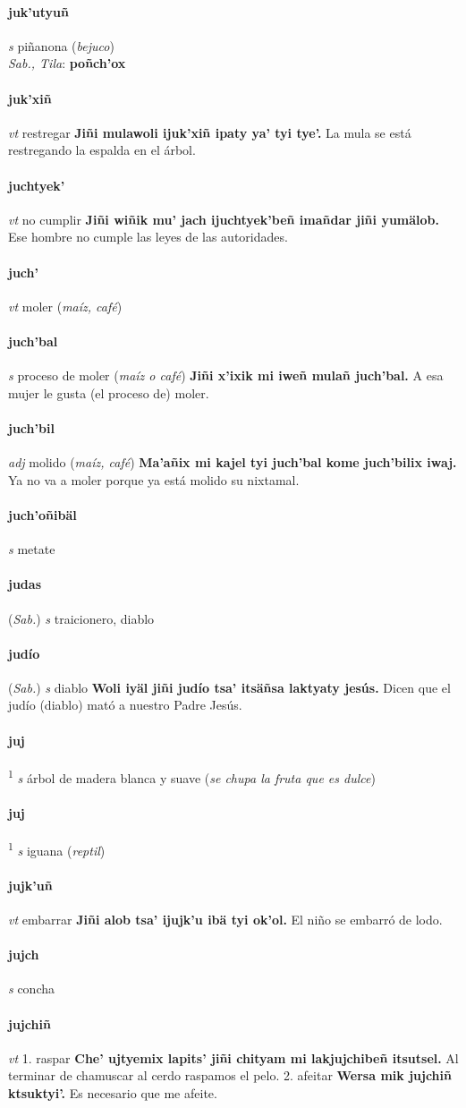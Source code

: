 \documentclass{scrbook}
\newcommand{\entry}[1]{\paragraph{#1}}
\newcommand{\onedefinition}[1]{#1.}
\newcommand{\defsuperscript}[1]{\textsuperscript{1}}
\newcommand{\partofspeech}[1]{\textit{#1}}
\newcommand{\spanishtranslation}[1]{#1}
\newcommand{\clarification}[1]{(\textit{#1})}
\newcommand{\cholexample}[1]{\textbf{#1}}
\newcommand{\exampletranslation}[1]{#1}
\newcommand{\dialectvariant}[1]{\\\textit{#1}:}
\newcommand{\dialectword}[1]{\textbf{#1}}
\newcommand{\relevantdialect}[1]{(\textit{#1})}
\begin{document}
\begin{multicols}{2}
\entry{juk'utyuñ}
\partofspeech{s}
\spanishtranslation{piñanona}
\clarification{bejuco}
\dialectvariant{Sab., Tila}
\dialectword{poñch'ox}

\entry{juk'xiñ}
\partofspeech{vt}
\spanishtranslation{restregar}
\cholexample{Jiñi mulawoli ijuk'xiñ ipaty ya' tyi tye'.}
\exampletranslation{La mula se está restregando la espalda en el árbol.}

\entry{juchtyek'}
\partofspeech{vt}
\spanishtranslation{no cumplir}
\cholexample{Jiñi wiñik mu' jach ijuchtyek'beñ imañdar jiñi yumälob.}
\exampletranslation{Ese hombre no cumple las leyes de las autoridades.}

\entry{juch'}
\partofspeech{vt}
\spanishtranslation{moler}
\clarification{maíz, café}

\entry{juch'bal}
\partofspeech{s}
\spanishtranslation{proceso de moler}
\clarification{maíz o café}
\cholexample{Jiñi x'ixik mi iweñ mulañ juch'bal.}
\exampletranslation{A esa mujer le gusta (el proceso de) moler.}

\entry{juch'bil}
\partofspeech{adj}
\spanishtranslation{molido}
\clarification{maíz, café}
\cholexample{Ma'añix mi kajel tyi juch'bal kome juch'bilix iwaj.}
\exampletranslation{Ya no va a moler porque ya está molido su nixtamal.}

\entry{juch'oñibäl}
\partofspeech{s}
\spanishtranslation{metate}

\entry{judas}
\relevantdialect{Sab.}
\partofspeech{s}
\spanishtranslation{traicionero, diablo}

\entry{judío}
\relevantdialect{Sab.}
\partofspeech{s}
\spanishtranslation{diablo}
\cholexample{Woli iyäl jiñi judío tsa' itsäñsa laktyaty jesús.}
\exampletranslation{Dicen que el judío (diablo) mató a nuestro Padre Jesús.}

\entry{juj}
\defsuperscript{1}
\partofspeech{s}
\spanishtranslation{árbol de madera blanca y suave}
\clarification{se chupa la fruta que es dulce}

\entry{juj}
\defsuperscript{2}
\partofspeech{s}
\spanishtranslation{iguana}
\clarification{reptil}

\entry{jujk'uñ}
\partofspeech{vt}
\spanishtranslation{embarrar}
\cholexample{Jiñi alob tsa' ijujk'u ibä tyi ok'ol.}
\exampletranslation{El niño se embarró de lodo.}

\entry{jujch}
\partofspeech{s}
\spanishtranslation{concha}

\entry{jujchiñ}
\partofspeech{vt}
\onedefinition{1}
\spanishtranslation{raspar}
\cholexample{Che' ujtyemix lapits' jiñi chityam mi lakjujchibeñ itsutsel.}
\exampletranslation{Al terminar de chamuscar al cerdo raspamos el pelo.}
\onedefinition{2}
\spanishtranslation{afeitar}
\cholexample{Wersa mik jujchiñ ktsuktyi'.}
\exampletranslation{Es necesario que me afeite.}


\end{multicols}
\end{document}
